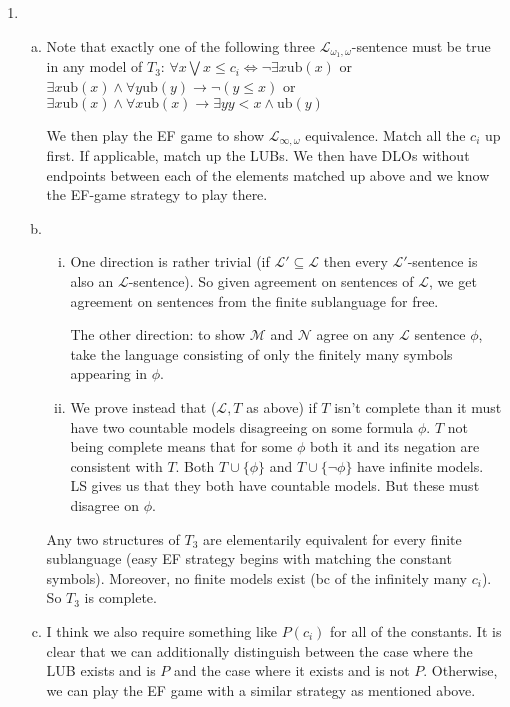 \documentclass[10pt]{article}
\newcommand{\A}{\forall}
\newcommand{\mcM}{\mathcal{M}}
\newcommand{\mcN}{\mathcal{N}}
\newcommand{\mcL}{\mathcal{L}}
\newcommand{\E}{\exists}
\begin{document}
\begin{enumerate}[1.]
\item
  \begin{enumerate}[a)]

    \item Note that exactly one of the following three \(\mcL_{\omega_1, \omega}\)-sentence must be true in any model of \(T_3\): 
    \(\A x \bigvee x \leq c_i \iff \neg\E x \text{ub}(x)\) or
    \(\E x \text{ub}(x) \land \A y \text{ub}(y) \to \neg(y \leq x)\) or
    \(\E x \text{ub}(x) \land \A x \text{ub}(x) \to \E y y < x \land \text{ub}(y)\)

    We then play the EF game to show \(\mcL_{\infty, \omega}\) equivalence. Match all the \(c_i\) up first. If applicable, match up the LUBs.
    We then have DLOs without endpoints between each of the elements matched up above and we know the EF-game strategy to play there.   
    
    \item
      \begin{enumerate}[i)]
        \item One direction is rather trivial (if \(\mcL' \subseteq \mcL\) then every \(\mcL'\)-sentence is also an \(\mcL\)-sentence). So given agreement on sentences of \(\mcL\), we get agreement on sentences from the finite sublanguage for free.

The other direction: to show \(\mcM\) and \(\mcN\) agree on any \(\mcL\) sentence \(\phi\), take the language consisting of only the finitely many symbols appearing in \(\phi\). 

        \item We prove instead that (\(\mcL, T\) as above) if \(T\) isn't complete than it must have two countable models disagreeing on some formula \(\phi\). \(T\) not being complete means that for some \(\phi\) both it and its negation are consistent with \(T\). Both \(T \cup \{\phi\}\) and \(T \cup \{\neg \phi\}\) have infinite models. LS gives us that they both have countable models. But these must disagree on \(\phi\). 

      \end{enumerate}

   Any two structures of \(T_3\) are elementarily equivalent for every finite sublanguage (easy EF strategy begins with matching the constant symbols). Moreover, no finite models exist (bc of the infinitely many \(c_i\)). So \(T_3\) is complete. 

    \item I think we also require something like \(P(c_i)\) for all of the constants. It is clear that we can additionally distinguish between the case where the LUB exists and is \(P\) and the case where it exists and is not \(P\). Otherwise, we can play the EF game with a similar strategy as mentioned above. 


\end{enumerate}
\end{enumerate}
\end{document}
